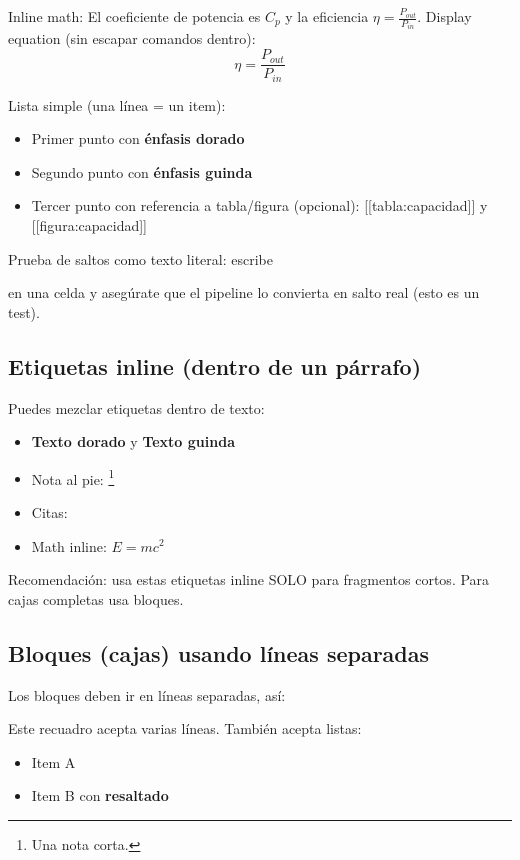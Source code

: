 \documentclass{sener2025}
\begin{document}
Inline math: El coeficiente de potencia es $C_p$ y la eficiencia $\eta = \frac{P_{out}}{P_{in}}$.
Display equation (sin escapar comandos dentro):
\begin{equation}
\eta = \frac{P_{out}}{P_{in}}
\end{equation}

Lista simple (una línea = un item):
\begin{itemize}
  \item Primer punto con \textbf{\textcolor{gobmxDorado}{énfasis dorado}}
  \item Segundo punto con \textbf{\textcolor{gobmxGuinda}{énfasis guinda}}
  \item Tercer punto con referencia a tabla/figura (opcional): [[tabla:capacidad]] y [[figura:capacidad]]
\end{itemize}
Prueba de saltos como texto literal: escribe

 en una celda y asegúrate que el pipeline lo convierta en salto real (esto es un test).


\subsection{Etiquetas inline (dentro de un párrafo)}

Puedes mezclar etiquetas dentro de texto:
\begin{itemize}
  \item \textbf{\textcolor{gobmxDorado}{Texto dorado}} y \textbf{\textcolor{gobmxGuinda}{Texto guinda}}
  \item Nota al pie: \footnote{Una nota corta.}
  \item Citas: \cite{demo_sener2025}
  \item Math inline: $E = mc^2$
\end{itemize}
Recomendación: usa estas etiquetas inline SOLO para fragmentos cortos. Para cajas completas usa bloques.


\subsection{Bloques (cajas) usando líneas separadas}

Los bloques deben ir en líneas separadas, así:

\begin{recuadro}[title={Nota metodológica}]
Este recuadro acepta varias líneas.
También acepta listas:
\begin{itemize}
  \item Item A
  \item Item B con \textbf{\textcolor{gobmxDorado}{resaltado}}
\end{itemize}
\end{recuadro}
\end{document}
